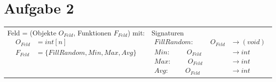 \section*{Aufgabe 2}
	\begin{tabularx}{\textwidth}{X X}
    	Feld = (Objekte $O_{Feld}$, Funktionen $F_{Feld}$) mit:
        {\begin{align*}
            O_{Feld} &= int[n] \\
            F_{Feld} &= \{ FillRandom, Min, Max, Avg\}
        \end{align*}}
        &
        Signaturen
        {\begin{align*}
            FillRandom:\hspace{1cm} O_{Feld} & \rightarrow (void)\\
            Min:\hspace{1cm} O_{Feld} & \rightarrow int \\
            Max:\hspace{1cm} O_{Feld} & \rightarrow int \\
            Avg:\hspace{1cm} O_{Feld} & \rightarrow int 
        \end{align*}}
    \end{tabularx}